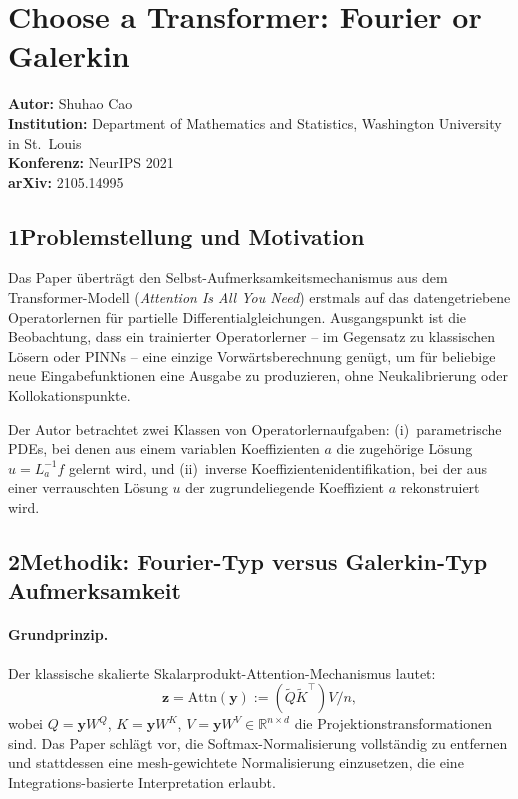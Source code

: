 \documentclass[a4paper,12pt]{article}
\begin{document}
\section*{Choose a Transformer: Fourier or Galerkin}

\textbf{Autor:} Shuhao Cao \\
\textbf{Institution:} Department of Mathematics and Statistics, Washington University in St.\ Louis \\
\textbf{Konferenz:} NeurIPS 2021 \\
\textbf{arXiv:} 2105.14995

\subsection*{1\quad Problemstellung und Motivation}

Das Paper überträgt den Selbst-Aufmerksamkeitsmechanismus aus dem Transformer-Modell
(\emph{Attention Is All You Need}) erstmals auf das datengetriebene Operatorlernen für
partielle Differentialgleichungen. Ausgangspunkt ist die Beobachtung, dass ein trainierter
Operatorlerner -- im Gegensatz zu klassischen Lösern oder PINNs -- eine einzige Vorwärtsberechnung
genügt, um für beliebige neue Eingabefunktionen eine Ausgabe zu produzieren, ohne Neukalibrierung
oder Kollokationspunkte.

Der Autor betrachtet zwei Klassen von Operatorlernaufgaben: (i)~parametrische PDEs, bei denen
aus einem variablen Koeffizienten $a$ die zugehörige Lösung $u = L_a^{-1}f$ gelernt wird, und
(ii)~inverse Koeffizientenidentifikation, bei der aus einer verrauschten Lösung $u$ der
zugrundeliegende Koeffizient $a$ rekonstruiert wird.

\subsection*{2\quad Methodik: Fourier-Typ versus Galerkin-Typ Aufmerksamkeit}

\paragraph{Grundprinzip.}
Der klassische skalierte Skalarprodukt-Attention-Mechanismus lautet:
\begin{equation}
    \mathbf{z} = \mathrm{Attn}(\mathbf{y}) := (\widetilde{Q}\widetilde{K}^\top)V / n,
\end{equation}
wobei $Q = \mathbf{y}W^Q$, $K = \mathbf{y}W^K$, $V = \mathbf{y}W^V \in \mathbb{R}^{n \times d}$
die Projektionstransformationen sind. Das Paper schlägt vor, die Softmax-Normalisierung vollständig
zu entfernen und stattdessen eine mesh-gewichtete Normalisierung einzusetzen, die eine
Integrations-basierte Interpretation erlaubt.
\end{document}
